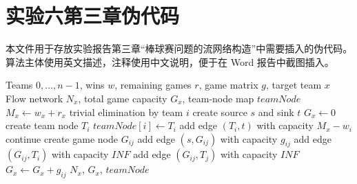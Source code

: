 \documentclass[UTF8,fontset=none]{ctexart}
\begin{document}
\section*{实验六第三章伪代码}

本文件用于存放实验报告第三章“棒球赛问题的流网络构造”中需要插入的伪代码。算法主体使用英文描述，注释使用中文说明，便于在 Word 报告中截图插入。

\begin{algorithm}[H]
\caption{Build Baseball Flow Network}
\begin{algorithmic}[1]
\Require Teams $0,\dots,n-1$, wins $w$, remaining games $r$, game matrix $g$, target team $x$
\Ensure Flow network $N_x$, total game capacity $G_x$, team-node map $teamNode$
\State $M_x \gets w_x + r_x$
        \State \Return trivial elimination by team $i$
    \EndIf
\EndFor
\State create source $s$ and sink $t$
\State $G_x \gets 0$
    \State create team node $T_i$
    \State $teamNode[i] \gets T_i$
    \State add edge $(T_i,t)$ with capacity $M_x-w_i$
\EndFor
{}
        \State continue
    \EndIf
    \State create game node $G_{ij}$
    \State add edge $(s,G_{ij})$ with capacity $g_{ij}$
    \State add edge $(G_{ij},T_i)$ with capacity $INF$
    \State add edge $(G_{ij},T_j)$ with capacity $INF$
    \State $G_x \gets G_x + g_{ij}$
\EndFor
\State \Return $N_x$, $G_x$, $teamNode$
\end{algorithmic}
\end{algorithm}
\end{document}
